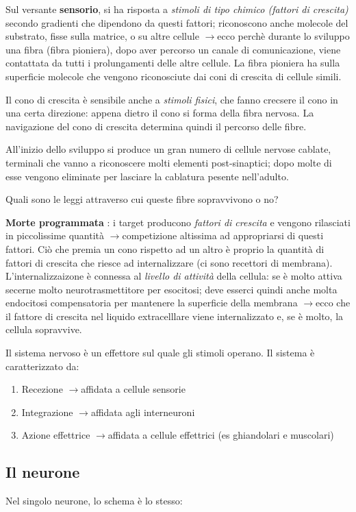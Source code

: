 \documentclass[a4paper,12pt]{article}
\newcommand{\lfreccia}{\ensuremath{\longrightarrow}}
\begin{document}
Sul versante \textbf{sensorio}, si ha risposta a \emph{stimoli di tipo chimico (fattori di crescita)} secondo gradienti che dipendono da questi fattori; riconoscono anche molecole del substrato, fisse sulla matrice, o su altre cellule \lfreccia ecco perchè durante lo sviluppo una fibra (fibra pioniera), dopo aver percorso un canale di comunicazione, viene contattata da tutti i prolungamenti delle altre cellule. La fibra pioniera ha sulla superficie molecole che vengono riconosciute dai coni di crescita di cellule simili. 

Il cono di crescita è sensibile anche a \emph{stimoli fisici}, che fanno crecsere il cono in una certa direzione: appena dietro il cono si forma della fibra nervosa. La navigazione del cono di crescita determina quindi il percorso delle fibre. 

All'inizio dello sviluppo si produce un gran numero di cellule nervose cablate, terminali che vanno a riconoscere molti elementi post-sinaptici; dopo molte di esse vengono eliminate per lasciare la cablatura pesente nell'adulto.

Quali sono le leggi attraverso cui queste fibre sopravvivono o no?

\textbf{Morte programmata} : i target producono \emph{fattori di crescita} e vengono rilasciati in piccolissime quantità \lfreccia competizione altissima ad appropriarsi di questi fattori. Ciò che premia un cono rispetto ad un altro è proprio la quantità di fattori di crescita che riesce ad internalizzare (ci sono recettori di membrana).
L'internalizzaizone è connessa al \emph{livello di attività} della cellula: se è molto attiva secerne molto neurotrasmettitore per esocitosi; deve esserci quindi anche molta endocitosi compensatoria per mantenere la superficie della membrana \lfreccia ecco che il fattore di crescita nel liquido extracelllare viene internalizzato e, se è molto, la cellula sopravvive.

Il sistema nervoso è un effettore sul quale gli stimoli operano. Il sistema è caratterizzato da:
\begin{enumerate}
\item{Recezione \lfreccia affidata a cellule sensorie}
\item{Integrazione \lfreccia affidata agli interneuroni}
\item{Azione effettrice \lfreccia affidata a cellule effettrici (es ghiandolari e muscolari)}
\end{enumerate}

\subsection{Il neurone}
Nel singolo neurone, lo schema è lo stesso:
\end{document}
